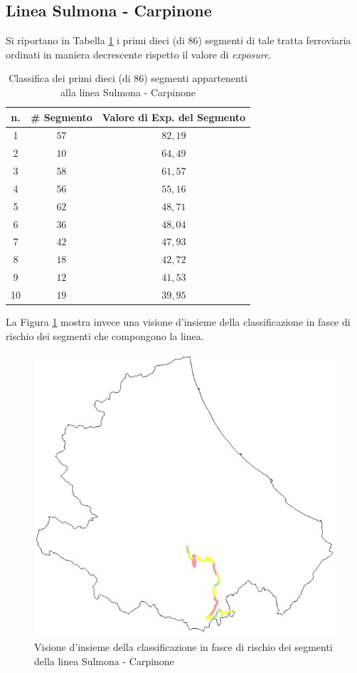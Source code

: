\subsection{Linea Sulmona - Carpinone}
Si riportano in Tabella \ref{classificasulmonacarpinone} i primi dieci (di 86) segmenti di tale tratta ferroviaria ordinati in maniera decrescente rispetto il valore di \textit{exposure}.
\begin{table}[hpt]
\centering
\begin{tabular}{|c|c|c|}
\hline
\rowcolor{lightgray}
n. & \# Segmento & Valore di Exp. del Segmento \\ \hline \rowcolor{flamingopink}
1  & $57$        & $82,19$                      \\ \hline \rowcolor{flamingopink}
2  & $10$        & $64,49$                      \\ \hline \rowcolor{flamingopink}
3  & $58$        & $61,57$                      \\ \hline \rowcolor{flamingopink}
4  & $56$        & $55,16$                      \\ \hline \rowcolor{flamingopink}
5  & $62$        & $48,71$                      \\ \hline \rowcolor{flamingopink}
6  & $36$        & $48,04$                      \\ \hline \rowcolor{flamingopink}
7  & $42$       & $47,93$                      \\ \hline \rowcolor{flamingopink}
8  & $18$        & $42,72$                      \\ \hline \rowcolor{flamingopink}
9  & $12$        & $41,53$                      \\ \hline \rowcolor{flamingopink}
10 & $19$        & $39,95$                      \\ \hline
\end{tabular}
\caption{Classifica dei primi dieci (di $86$) segmenti appartenenti alla linea Sulmona - Carpinone}
\label{classificasulmonacarpinone}
\end{table}
\newline
La Figura \ref{sulmonacarpinone} mostra invece una visione d'insieme della classificazione in fasce di rischio dei segmenti che compongono la linea.
\begin{figure}[hpt]
\centering
\includegraphics[width=0.4\linewidth]{img/sulmonacarpinone.jpeg}
\caption{Visione d'insieme della classificazione in fasce di rischio dei segmenti della linea Sulmona - Carpinone}
\label{sulmonacarpinone}
\end{figure}
